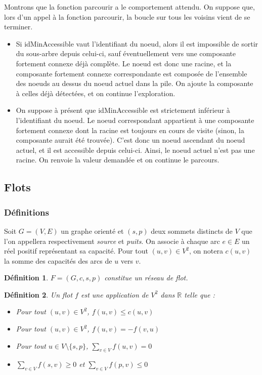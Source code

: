\documentclass[11pt,a4paper]{article}
\newtheorem*{definition}{Définition}
\begin{document}
Montrons que la fonction parcourir a le comportement attendu. On suppose que, lors d'un appel à la fonction parcourir, la boucle sur tous les voisins vient de se terminer.
\begin{itemize}
  \item Si idMinAccessible vaut l'identifiant du noeud, alors il est impossible de sortir du sous-arbre depuis celui-ci, sauf éventuellement vers une composante fortement connexe déjà complète. Le noeud est donc une racine, et la composante fortement connexe correspondante est composée de l'ensemble des noeuds au dessus du noeud actuel dans la pile. On ajoute la composante à celles déjà détectées, et on continue l'exploration.
  \item On suppose à présent que idMinAccessible est strictement inférieur à l'identifiant du noeud. Le noeud correspondant appartient à une composante fortement connexe dont la racine est toujours en cours de visite (sinon, la composante aurait été trouvée). C'est donc un noeud ascendant du noeud actuel, et il est accessible depuis celui-ci. Ainsi, le noeud actuel n'est pas une racine. On renvoie la valeur demandée et on continue le parcours.
\end{itemize}


  \subsection{Flots}
    \subsubsection{Définitions}

Soit \(G=(V,E)\) un graphe orienté et \((s,p)\) deux sommets distincts de \(V\) que l'on appellera respectivement \textit{source} et \textit{puits}. On associe à chaque arc \(e \in E\) un réel positif représentant sa capacité. Pour tout \((u,v) \in V^2\), on notera \(c(u,v)\) la somme des capacités des arcs de \(u\) vers \(v\).

\begin{definition}
  \(F = (G,c,s,p)\) constitue un réseau de flot.
\end{definition}

\begin{definition}
  Un flot \(f\) est une application de \(V^2\) dans \(\mathbb{R}\) telle que :
  \begin{itemize}
    \item Pour tout \((u,v) \in V^2\), \(f(u,v) \leq c(u,v)\)
    \item Pour tout \((u,v) \in V^2\), \(f(u,v) = -f(v,u)\)
    \item Pour tout \(u \in V \setminus \{s,p\}\), \(\sum\limits_{v \in V} f(u,v) = 0\)
    \item \(\sum\limits_{v \in V} f(s,v) \geq 0\) et \(\sum\limits_{v \in V} f(p,v) \leq 0\)
  \end{itemize}
\end{definition}
\end{document}

